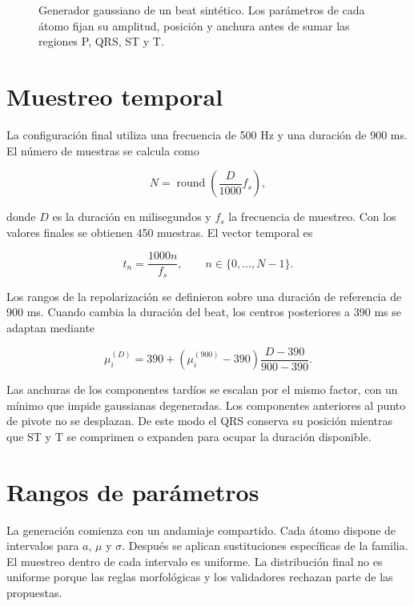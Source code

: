 \begin{figure}[H]
  \centering
  \caption{Generador gaussiano de un beat sintético. Los parámetros de cada átomo fijan su amplitud, posición y anchura antes de sumar las regiones P, QRS, ST y T.}
  \label{fig:gaussian_generator}
\end{figure}

\section{Muestreo temporal}

La configuración final utiliza una frecuencia de 500 Hz y una duración de 900 ms. El número de muestras se calcula como

\begin{equation}
N =
\operatorname{round}
\left(
\frac{D}{1000}f_s
\right),
\end{equation}

donde \(D\) es la duración en milisegundos y \(f_s\) la frecuencia de muestreo. Con los valores finales se obtienen 450 muestras. El vector temporal es

\begin{equation}
t_n =
\frac{1000n}{f_s},
\qquad
n \in \{0,\ldots,N-1\}.
\end{equation}

Los rangos de la repolarización se definieron sobre una duración de referencia de 900 ms. Cuando cambia la duración del beat, los centros posteriores a 390 ms se adaptan mediante

\begin{equation}
\mu_i^{(D)} =
390 +
\left(
\mu_i^{(900)}-390
\right)
\frac{D-390}{900-390}.
\label{eq:time_scaling}
\end{equation}

Las anchuras de los componentes tardíos se escalan por el mismo factor, con un mínimo que impide gaussianas degeneradas. Los componentes anteriores al punto de pivote no se desplazan. De este modo el QRS conserva su posición mientras que ST y T se comprimen o expanden para ocupar la duración disponible.

\section{Rangos de parámetros}

La generación comienza con un andamiaje compartido. Cada átomo dispone de intervalos para \(a\), \(\mu\) y \(\sigma\). Después se aplican sustituciones específicas de la familia. El muestreo dentro de cada intervalo es uniforme. La distribución final no es uniforme porque las reglas morfológicas y los validadores rechazan parte de las propuestas.

